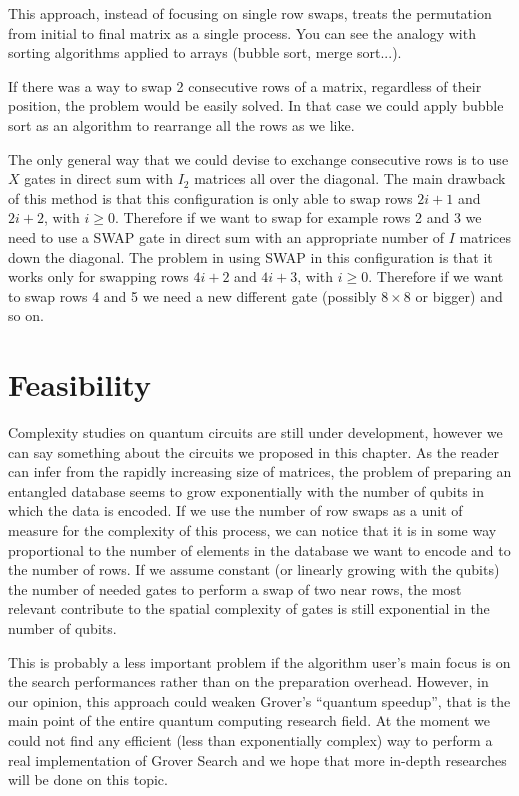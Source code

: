This approach, instead of focusing on single row swaps, treats the permutation from initial to final matrix as a single process. You can see the analogy with sorting algorithms applied to arrays (bubble sort, merge sort...).

If there was a way to swap 2 consecutive rows of a matrix, regardless of their position, the problem would be easily solved. In that case we could apply bubble sort as an algorithm to rearrange all the rows as we like.

\bigskip

The only general way that we could devise to exchange consecutive rows is to use $X$ gates in direct sum with $I_2$ matrices all over the diagonal. The main drawback of this method is that this configuration is only able to swap rows $2i+1$ and $2i+2$, with $i \geq 0$. Therefore if we want to swap for example rows 2 and 3 we need to use a SWAP gate in direct sum with an appropriate number of $I$ matrices down the diagonal. The problem in using SWAP in this configuration is that it works only for swapping rows $4i+2$ and $4i+3$, with $i \geq 0$. Therefore if we want to swap rows 4 and 5 we need a new different gate (possibly $8 \times 8$ or bigger) and so on.

\section{Feasibility}

Complexity studies on quantum circuits are still under development, however we can say something about the circuits we proposed in this chapter. As the reader can infer from the rapidly increasing size of matrices, the problem of preparing an entangled database seems to grow exponentially with the number of qubits in which the data is encoded. If we use the number of row swaps as a unit of measure for the complexity of this process, we can notice that it is in some way proportional to the number of elements in the database we want to encode and to the number of rows. If we assume constant (or linearly growing with the qubits) the number of needed gates to perform a swap of two near rows, the most relevant contribute to the spatial complexity of gates is still exponential in the number of qubits.

This is probably a less important problem if the algorithm user's main focus is on the search performances rather than on the preparation overhead. However, in our opinion, this approach could weaken Grover's ``quantum speedup'', that is the main point of the entire quantum computing research field. At the moment we could not find any efficient (less than exponentially complex) way to perform a real implementation of Grover Search and we hope that more in-depth researches will be done on this topic.
